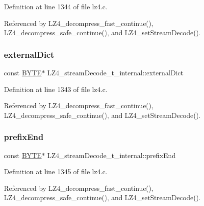 Definition at line 1344 of file lz4.\+c.



Referenced by L\+Z4\+\_\+decompress\+\_\+fast\+\_\+continue(), L\+Z4\+\_\+decompress\+\_\+safe\+\_\+continue(), and L\+Z4\+\_\+set\+Stream\+Decode().

\mbox{\label{structLZ4__streamDecode__t__internal_a0edc5a25f4e1e84e48c1a60900dabd4f}} 
\subsubsection{\texorpdfstring{external\+Dict}{externalDict}}
{\footnotesize\ttfamily const \mbox{\hyperlink{lz4_8c_a4ae1dab0fb4b072a66584546209e7d58}{B\+Y\+TE}}$\ast$ L\+Z4\+\_\+stream\+Decode\+\_\+t\+\_\+internal\+::external\+Dict}



Definition at line 1343 of file lz4.\+c.



Referenced by L\+Z4\+\_\+decompress\+\_\+fast\+\_\+continue(), L\+Z4\+\_\+decompress\+\_\+safe\+\_\+continue(), and L\+Z4\+\_\+set\+Stream\+Decode().

\mbox{\label{structLZ4__streamDecode__t__internal_ae54ddf8eaf34cbc8919fb0dea3a5cb60}} 
\subsubsection{\texorpdfstring{prefix\+End}{prefixEnd}}
{\footnotesize\ttfamily const \mbox{\hyperlink{lz4_8c_a4ae1dab0fb4b072a66584546209e7d58}{B\+Y\+TE}}$\ast$ L\+Z4\+\_\+stream\+Decode\+\_\+t\+\_\+internal\+::prefix\+End}



Definition at line 1345 of file lz4.\+c.



Referenced by L\+Z4\+\_\+decompress\+\_\+fast\+\_\+continue(), L\+Z4\+\_\+decompress\+\_\+safe\+\_\+continue(), and L\+Z4\+\_\+set\+Stream\+Decode().

